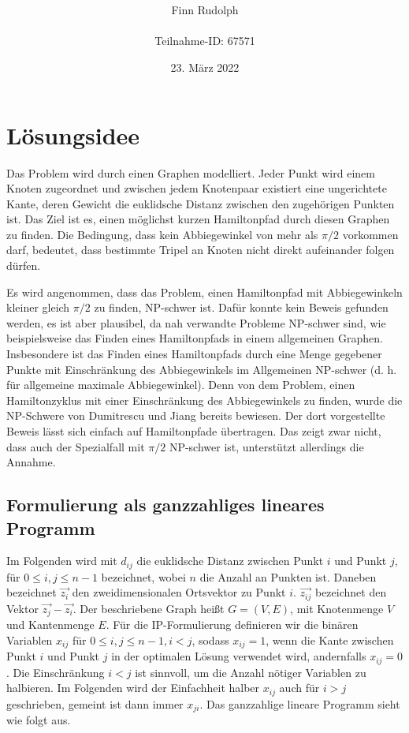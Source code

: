 \documentclass[a4paper, 10pt, ngerman]{article}
\title{\LARGE \textbf{\Aufgabe}}
\author{\large Finn Rudolph \\ \\ \large Teilnahme-ID: 67571}
\date{\large 23. März 2022}
\begin{document}
\begin{titlepage}
    \maketitle
    \tableofcontents
    \thispagestyle{empty}
\end{titlepage}

\newtheorem{theorem}{Satz}
\newtheorem{lemma}{Lemma}
\theoremstyle{definition}
\newtheorem{definition}{Definition}

\section{Lösungsidee}

Das Problem wird durch einen Graphen modelliert. Jeder Punkt wird einem Knoten zugeordnet und zwischen jedem Knotenpaar existiert eine ungerichtete Kante, deren Gewicht die euklidsche Distanz zwischen den zugehörigen Punkten ist. Das Ziel ist es, einen möglichst kurzen Hamiltonpfad durch diesen Graphen zu finden. Die Bedingung, dass kein Abbiegewinkel von mehr als $\pi / 2$ vorkommen darf, bedeutet, dass bestimmte Tripel an Knoten nicht direkt aufeinander folgen dürfen.

Es wird angenommen, dass das Problem, einen Hamiltonpfad mit Abbiegewinkeln kleiner gleich $\pi / 2$ zu finden, NP-schwer ist. Dafür konnte kein Beweis gefunden werden, es ist aber plausibel, da nah verwandte Probleme NP-schwer sind, wie beispielsweise das Finden eines Hamiltonpfads in einem allgemeinen Graphen. Insbesondere ist das Finden eines Hamiltonpfads durch eine Menge gegebener Punkte mit Einschränkung des Abbiegewinkels im Allgemeinen NP-schwer (d. h. für allgemeine maximale Abbiegewinkel). Denn von dem Problem, einen Hamiltonzyklus mit einer Einschränkung des  Abbiegewinkels zu finden, wurde die NP-Schwere von Dumitrescu und Jiang \cite{nphard} bereits bewiesen. Der dort vorgestellte Beweis lässt sich einfach auf Hamiltonpfade übertragen. Das zeigt zwar nicht, dass auch der Spezialfall mit $\pi / 2$ NP-schwer ist, unterstützt allerdings die Annahme.

\subsection{Formulierung als ganzzahliges lineares Programm}

Im Folgenden wird mit $d_{ij}$ die euklidsche Distanz zwischen Punkt $i$ und Punkt $j$, für $0 \le i, j \le n - 1$ bezeichnet, wobei $n$ die Anzahl an Punkten ist. Daneben bezeichnet $\vec{z_i}$ den zweidimensionalen Ortsvektor zu Punkt $i$. $\vec{z_{ij}}$ bezeichnet den Vektor $\vec{z_j} - \vec{z_i}$. Der beschriebene Graph heißt $G = (V, E)$, mit Knotenmenge $V$ und Kantenmenge $E$. Für die IP-Formulierung definieren wir die binären Variablen $x_{ij}$ für $0 \le i, j \le n - 1, i < j$, sodass $x_{ij} = 1$, wenn die Kante zwischen Punkt $i$ und Punkt $j$ in der optimalen Lösung verwendet wird, andernfalls $x_{ij} = 0$. Die Einschränkung $i < j$ ist sinnvoll, um die Anzahl nötiger Variablen zu halbieren. Im Folgenden wird der Einfachheit halber $x_{ij}$ auch für $i > j$ geschrieben, gemeint ist dann immer $x_{ji}$. Das ganzzahlige lineare Programm sieht wie folgt aus.
\end{document}
